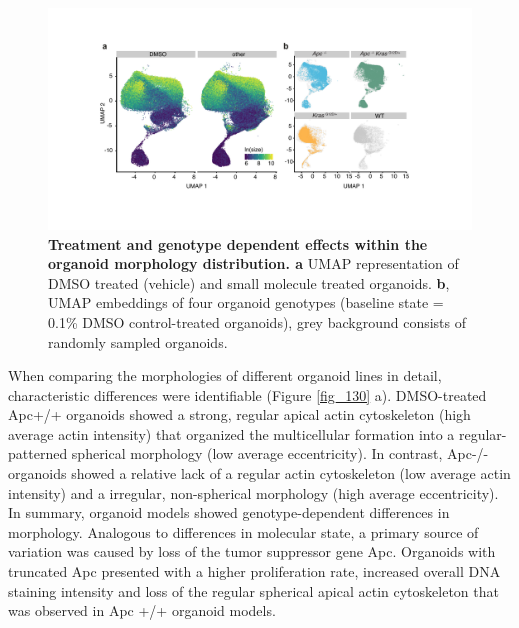\begin{flushleft}
\bigbreak
\begin{figure}[h!]
\centering
\includegraphics[width=\textwidth,
                height=\textheight,
                keepaspectratio]{figures/adenomaprofiling/pdf/fig_1_4.pdf}
\caption[Treatment and genotype dependent effects within the organoid morphology distribution]{\textbf{Treatment and genotype dependent effects within the organoid morphology distribution. a} UMAP representation of DMSO treated (vehicle) and small molecule treated organoids. \textbf{b}, UMAP embeddings of four organoid genotypes (baseline state = 0.1\% DMSO control-treated organoids), grey background consists of randomly sampled organoids.}
\label{fig_140}
\end{figure}

When comparing the morphologies of different organoid lines in detail, characteristic differences were identifiable (Figure \ref{fig_130} a). DMSO-treated Apc+/+ organoids showed a strong, regular apical actin cytoskeleton (high average actin intensity) that organized the multicellular formation into a regular-patterned spherical morphology (low average eccentricity). In contrast, Apc-/- organoids showed a relative lack of a regular actin cytoskeleton (low average actin intensity) and a irregular, non-spherical morphology (high average eccentricity). In summary, organoid models showed genotype-dependent differences in morphology. Analogous to differences in molecular state, a primary source of variation was caused by loss of the tumor suppressor gene Apc. Organoids with truncated Apc presented with a higher proliferation rate, increased overall DNA staining intensity and loss of the regular spherical apical actin cytoskeleton that was observed in Apc +/+ organoid models.


\end{flushleft}
